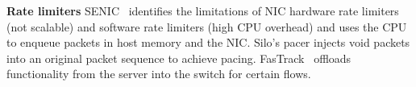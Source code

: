 {\bf Rate limiters}
SENIC~\cite{niranjan2013fastrak}
identifies the limitations of NIC hardware rate limiters (\ie{}not scalable) and
software rate limiters (\ie{}high CPU overhead) and uses the CPU to enqueue packets
in host memory and the NIC. Silo's pacer injects void packets into
an original packet sequence to achieve pacing. FasTrack~\cite{niranjan2013fastrak} offloads
functionality from the server into the switch for certain flows.

